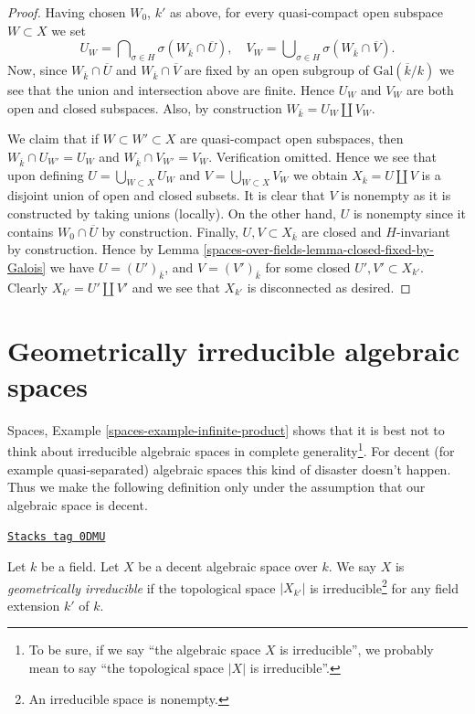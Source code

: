 \begin{proof}
\medskip\noindent
Having chosen $W_0$, $k'$ as above, for every quasi-compact open subspace
$W \subset X$ we set
$$
U_W =
\bigcap\nolimits_{\sigma \in H} \sigma(W_{\overline{k}} \cap \overline{U}),
\quad
V_W =
\bigcup\nolimits_{\sigma \in H} \sigma(W_{\overline{k}} \cap \overline{V}).
$$
Now, since $W_{\overline{k}} \cap \overline{U}$ and
$W_{\overline{k}} \cap \overline{V}$ are fixed by an open subgroup of
$\text{Gal}(\overline{k}/k)$ we see that the union and intersection
above are finite. Hence $U_W$ and $V_W$ are both open and closed subspaces.
Also, by construction $W_{\bar k} = U_W \amalg V_W$.

\medskip\noindent
We claim that if $W \subset W' \subset X$ are quasi-compact
open subspaces, then $W_{\overline{k}} \cap U_{W'} = U_W$ and
$W_{\overline{k}} \cap V_{W'} = V_W$. Verification omitted.
Hence we see that upon defining $U = \bigcup_{W \subset X} U_W$
and $V = \bigcup_{W \subset X} V_W$ we obtain
$X_{\overline{k}} = U \amalg V$ is a disjoint union of open
and closed subsets.
It is clear that $V$ is nonempty as it is constructed by taking
unions (locally). On the other hand, $U$ is nonempty since it contains
$W_0 \cap \overline{U}$ by construction. Finally, $U, V \subset X_{\bar k}$
are closed and $H$-invariant by construction. Hence by
Lemma \ref{spaces-over-fields-lemma-closed-fixed-by-Galois}
we have $U = (U')_{\bar k}$, and $V = (V')_{\bar k}$ for some
closed $U', V' \subset X_{k'}$. Clearly $X_{k'} = U' \amalg V'$
and we see that $X_{k'}$ is disconnected as desired.
\end{proof}

\section{Geometrically irreducible algebraic spaces}
\label{spaces-over-fields-section-geometrically-irreducible}
Spaces, Example \ref{spaces-example-infinite-product} shows that it
is best not to think about irreducible algebraic spaces in complete
generality\footnote{To be sure, if we say ``the algebraic space $X$
is irreducible'', we probably mean to say ``the topological space $|X|$
is irreducible''.}. For decent (for example quasi-separated) algebraic spaces
this kind of disaster doesn't happen. Thus we make the following
definition only under the assumption that our algebraic space is decent.

\begin{definition}
\label{spaces-over-fields-definition-geometrically-irreducible}
\href{https://stacks.math.columbia.edu/tag/0DMU}{\texttt{Stacks tag 0DMU}}

Let $k$ be a field.
Let $X$ be a decent algebraic space over $k$.
We say $X$ is {\it geometrically irreducible} if the
topological space $|X_{k'}|$ is
irreducible\footnote{An irreducible space is nonempty.}
for any field extension $k'$ of $k$.
\end{definition}

